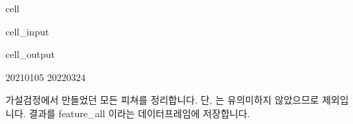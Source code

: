 \documentclass[letterpaper,10pt,english]{jupyterBook}
\begin{document}
\begin{sphinxuseclass}{cell}\begin{sphinxVerbatimInput}

\begin{sphinxuseclass}{cell_input}
\begin{sphinxVerbatim}[commandchars=\\\{\}]
   
 
\end{sphinxVerbatim}

\end{sphinxuseclass}\end{sphinxVerbatimInput}
\begin{sphinxVerbatimOutput}

\begin{sphinxuseclass}{cell_output}
\begin{sphinxVerbatim}[commandchars=\\\{\}]
2021\PYGZhy{}01\PYGZhy{}05 2022\PYGZhy{}03\PYGZhy{}24
\end{sphinxVerbatim}

\end{sphinxuseclass}\end{sphinxVerbatimOutput}

\end{sphinxuseclass}
\sphinxAtStartPar
 가설검정에서 만들었던 모든 피쳐를 정리합니다. 단,  는 유의미하지 않았으므로 제외입니다. 결과를 feature\_all 이라는 데이터프레임에 저장합니다.
\end{document}
